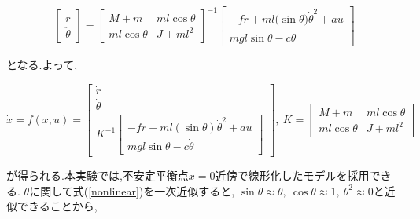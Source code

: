 $$
    \left[
    \begin{array}{c}
        \ddot{r} \\
        \ddot{\theta}
    \end{array}    
    \right]
    =
    \left[
    \begin{array}{cc}
        M + m           &  ml\cos{\theta} \\
        ml\cos{\theta}  &  J + ml^2
    \end{array}
    \right]^{-1}
    \left[
        \begin{array}{c}
            -f \dot{r} + ml(\sin{\theta)} \dot{\theta}^2 + au \\
            mgl\sin{\theta} - c \dot{\theta}
        \end{array}
    \right]
$$

となる.よって,

\begin{equation}
    \dot x = f(x, u) = 
    \left[
        \begin{array}{c}
            \dot{r} \\
            \dot{\theta} \\
            K^{-1}
            \left[
                \begin{array}{c}
                    -f \dot{r} + ml(\sin{\theta}) \dot{\theta}^2 + au \\
                    mgl\sin{\theta} - c \dot{\theta}
                \end{array}
            \right]
        \end{array}    
    \right],\
    K = 
    \left[
        \begin{array}{cc}
            M + m           &  ml\cos{\theta} \\
            ml\cos{\theta}  &  J + ml^2
        \end{array}
    \right]
    \label{nonlinear}
\end{equation}

が得られる.本実験では,不安定平衡点$x=0$近傍で線形化したモデルを採用できる.
$\theta$に関して式(\ref{nonlinear})を一次近似すると,
$\sin{\theta} \approx \theta,\ \cos{\theta} \approx 1,\ \theta^2 \approx 0$と近似できることから,

